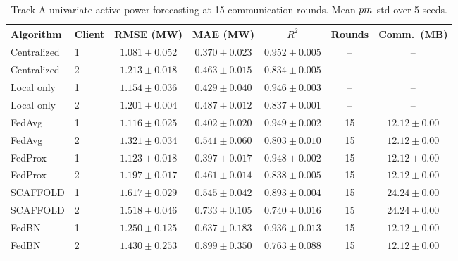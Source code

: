 \begin{table}[t]
\centering
\small
\begin{tabular}{llccccc}
\toprule
Algorithm & Client & RMSE (MW) & MAE (MW) & $R^2$ & Rounds & Comm.\ (MB) \\
\midrule
Centralized & 1 & $1.081 \pm 0.052$ & $0.370 \pm 0.023$ & $0.952 \pm 0.005$ & -- & -- \\
Centralized & 2 & $1.213 \pm 0.018$ & $0.463 \pm 0.015$ & $0.834 \pm 0.005$ & -- & -- \\
Local only & 1 & $1.154 \pm 0.036$ & $0.429 \pm 0.040$ & $0.946 \pm 0.003$ & -- & -- \\
Local only & 2 & $1.201 \pm 0.004$ & $0.487 \pm 0.012$ & $0.837 \pm 0.001$ & -- & -- \\
FedAvg & 1 & $1.116 \pm 0.025$ & $0.402 \pm 0.020$ & $0.949 \pm 0.002$ & 15 & $12.12 \pm 0.00$ \\
FedAvg & 2 & $1.321 \pm 0.034$ & $0.541 \pm 0.060$ & $0.803 \pm 0.010$ & 15 & $12.12 \pm 0.00$ \\
FedProx & 1 & $1.123 \pm 0.018$ & $0.397 \pm 0.017$ & $0.948 \pm 0.002$ & 15 & $12.12 \pm 0.00$ \\
FedProx & 2 & $1.197 \pm 0.017$ & $0.461 \pm 0.014$ & $0.838 \pm 0.005$ & 15 & $12.12 \pm 0.00$ \\
SCAFFOLD & 1 & $1.617 \pm 0.029$ & $0.545 \pm 0.042$ & $0.893 \pm 0.004$ & 15 & $24.24 \pm 0.00$ \\
SCAFFOLD & 2 & $1.518 \pm 0.046$ & $0.733 \pm 0.105$ & $0.740 \pm 0.016$ & 15 & $24.24 \pm 0.00$ \\
FedBN & 1 & $1.250 \pm 0.125$ & $0.637 \pm 0.183$ & $0.936 \pm 0.013$ & 15 & $12.12 \pm 0.00$ \\
FedBN & 2 & $1.430 \pm 0.253$ & $0.899 \pm 0.350$ & $0.763 \pm 0.088$ & 15 & $12.12 \pm 0.00$ \\
\bottomrule
\end{tabular}
\caption{Track A univariate active-power forecasting at 15 communication rounds. Mean $\\pm$ std over 5 seeds.}
\label{tab:track-a-15}
\end{table}
